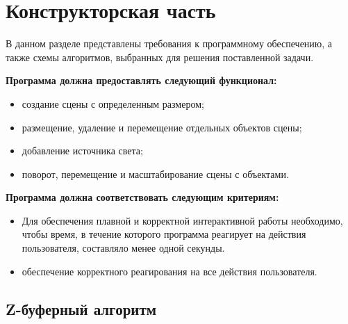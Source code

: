 \chapter{Конструкторская часть}

В данном разделе представлены требования к программному обеспечению, а также схемы алгоритмов, выбранных для решения поставленной задачи.

\textbf{Программа должна предоставлять следующий функционал:}
\begin{itemize}
\item создание сцены с определенным размером;
\item размещение, удаление и перемещение отдельных объектов сцены;
\item добавление источника света;
\item поворот, перемещение и масштабирование сцены  с объектами.
\end{itemize}

\textbf{Программа должна соответствовать следующим критериям: }
\begin{itemize}
\item Для обеспечения плавной и корректной интерактивной работы необходимо, чтобы время, в течение которого программа реагирует на действия пользователя, составляло менее одной секунды.
\item обеспечение корректного реагирования на все действия пользователя.
\end{itemize}


\section{Z-буферный алгоритм}

